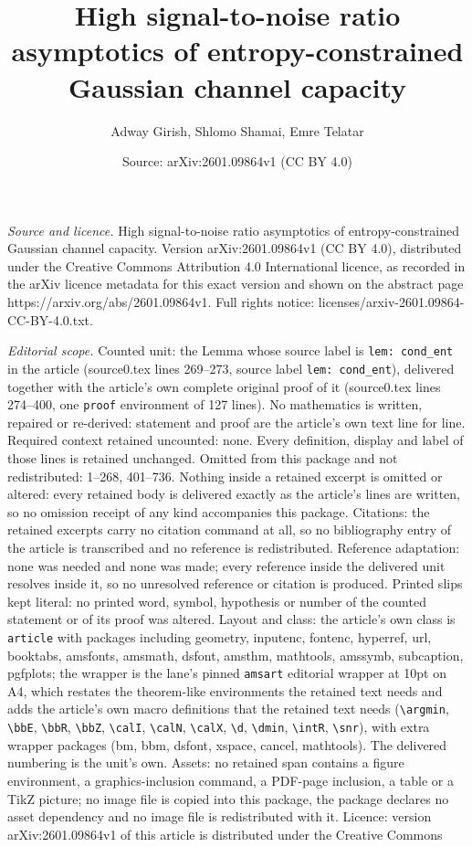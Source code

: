 \documentclass[10pt,a4paper]{amsart}
\title[High signal-to-noise ratio asymptotics of entropy-constraine]{High signal-to-noise ratio asymptotics of entropy-constrained Gaussian channel capacity}
\author{Adway Girish, Shlomo Shamai, Emre Telatar}
\date{Source: arXiv:2601.09864v1 (CC BY 4.0)}
\begin{document}
\maketitle

\noindent\emph{Source and licence.} High signal-to-noise ratio asymptotics of entropy-constrained Gaussian channel capacity. Version arXiv:2601.09864v1 (CC BY 4.0), distributed under the Creative Commons Attribution 4.0 International licence, as recorded in the arXiv licence metadata for this exact version and shown on the abstract page https://arxiv.org/abs/2601.09864v1. Full rights notice: licenses/arxiv-2601.09864-CC-BY-4.0.txt.\par\smallskip

\noindent\textit{Editorial scope.} Counted unit: the Lemma whose source label is \texttt{lem: cond\_ent} in the article (source0.tex lines 269--273, source label \texttt{lem: cond\_ent}), delivered together with the article's own complete original proof of it (source0.tex lines 274--400, one \texttt{proof} environment of 127 lines). No mathematics is written, repaired or re-derived: statement and proof are the article's own text line for line. Required context retained uncounted: none. Every definition, display and label of those lines is retained unchanged. Omitted from this package and not redistributed: 1--268, 401--736. Nothing inside a retained excerpt is omitted or altered: every retained body is delivered exactly as the article's lines are written, so no omission receipt of any kind accompanies this package. Citations: the retained excerpts carry no citation command at all, so no bibliography entry of the article is transcribed and no reference is redistributed. Reference adaptation: none was needed and none was made; every reference inside the delivered unit resolves inside it, so no unresolved reference or citation is produced. Printed slips kept literal: no printed word, symbol, hypothesis or number of the counted statement or of its proof was altered. Layout and class: the article's own class is \texttt{article} with packages including geometry, inputenc, fontenc, hyperref, url, booktabs, amsfonts, amsmath, dsfont, amsthm, mathtools, amssymb, subcaption, pgfplots; the wrapper is the lane's pinned \texttt{amsart} editorial wrapper at 10pt on A4, which restates the theorem-like environments the retained text needs and adds the article's own macro definitions that the retained text needs (\texttt{\textbackslash argmin}, \texttt{\textbackslash bbE}, \texttt{\textbackslash bbR}, \texttt{\textbackslash bbZ}, \texttt{\textbackslash calI}, \texttt{\textbackslash calN}, \texttt{\textbackslash calX}, \texttt{\textbackslash d}, \texttt{\textbackslash dmin}, \texttt{\textbackslash intR}, \texttt{\textbackslash snr}), with extra wrapper packages (bm, bbm, dsfont, xspace, cancel, mathtools). The delivered numbering is the unit's own. Assets: no retained span contains a figure environment, a graphics-inclusion command, a PDF-page inclusion, a table or a TikZ picture; no image file is copied into this package, the package declares no asset dependency and no image file is redistributed with it. Licence: version arXiv:2601.09864v1 of this article is distributed under the Creative Commons 
\end{document}
